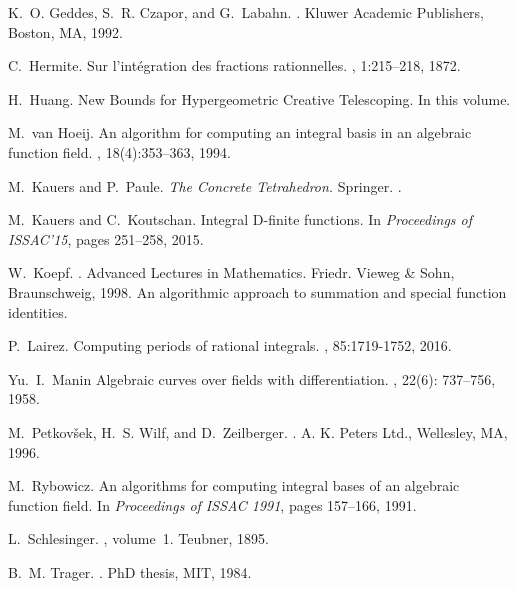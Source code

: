 \documentclass{sig-alternate-05-2015}
\begin{document}
\begin{thebibliography}{10}
K.~O. Geddes, S.~R. Czapor, and G.~Labahn.
.
\newblock Kluwer Academic Publishers, Boston, MA, 1992.

C.~Hermite.
\newblock Sur l'int\'egration des fractions rationnelles.
, 1:215--218, 1872.

  H.~Huang.
  \newblock New Bounds for Hypergeometric Creative Telescoping.
  \newblock In this volume.

M.~van Hoeij.
\newblock An algorithm for computing an integral basis in an algebraic function
  field.
, 18(4):353--363, 1994.

  M.~Kauers and P.~Paule.
  \newblock \emph{The Concrete Tetrahedron.}
  \newblock Springer.
  .

M.~Kauers and C.~Koutschan.
\newblock Integral {D}-finite functions.
\newblock In {\em Proceedings of ISSAC'15}, pages 251--258, 2015.

W.~Koepf.
.
\newblock Advanced Lectures in Mathematics. Friedr. Vieweg \& Sohn,
  Braunschweig, 1998.
\newblock An algorithmic approach to summation and special function identities.

P.~Lairez.
\newblock Computing periods of rational integrals.
, 85:1719-1752, 2016.

Yu.~I.~Manin
\newblock Algebraic curves over fields with differentiation.
, 22(6): 737--756, 1958.

M.~Petkov{\v{s}}ek, H.~S. Wilf, and D.~Zeilberger.
.
\newblock A. K. Peters Ltd., Wellesley, MA, 1996.

M.~Rybowicz.
\newblock An algorithms for computing integral bases of an algebraic function
  field.
\newblock In {\em Proceedings of ISSAC 1991}, pages 157--166, 1991.

L.~Schlesinger.
,
  volume~1.
\newblock Teubner, 1895.

B.~M. Trager.
.
\newblock PhD thesis, MIT, 1984.


\end{thebibliography}
\end{document}
